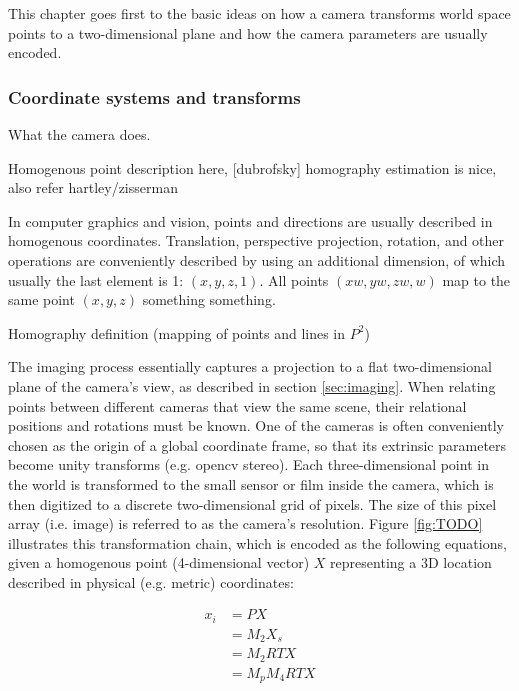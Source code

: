 This chapter goes first to the basic ideas on how a camera transforms world space points to a two-dimensional plane and how the camera parameters are usually encoded.

\subsubsection{Coordinate systems and transforms}

What the camera does.

Homogenous point description here, [dubrofsky] homography estimation is nice, also refer hartley/zisserman

In computer graphics and vision, points and directions are usually described in homogenous coordinates. Translation, perspective projection, rotation, and other operations are conveniently described by using an additional dimension, of which usually the last element is 1: $(x, y, z, 1)$. All points $(xw, yw, zw, w)$ map to the same point $(x, y, z)$ something something.

Homography definition (mapping of points and lines in $P^2$)

The imaging process essentially captures a projection to a flat two-dimensional plane of the camera's view, as described in section \ref{sec:imaging}.
When relating points between different cameras that view the same scene, their relational positions and rotations must be known.
One of the cameras is often conveniently chosen as the origin of a global coordinate frame, so that its extrinsic parameters become unity transforms (e.g. opencv stereo).
Each three-dimensional point in the world is transformed to the small sensor or film inside the camera, which is then digitized to a discrete two-dimensional grid of pixels. The size of this pixel array (i.e. image) is referred to as the camera's resolution.
Figure \ref{fig:TODO} illustrates this transformation chain, which is encoded as the following equations, given a homogenous point (4-dimensional vector) $X$ representing a 3D location described in physical (e.g. metric) coordinates:

\begin{align}
	x_i &= P X\\
	  &= M_2 X_s\\ %
	  &= M_2 R T X\\
	  &= M_p M_4 R T X\\ %
\end{align}

